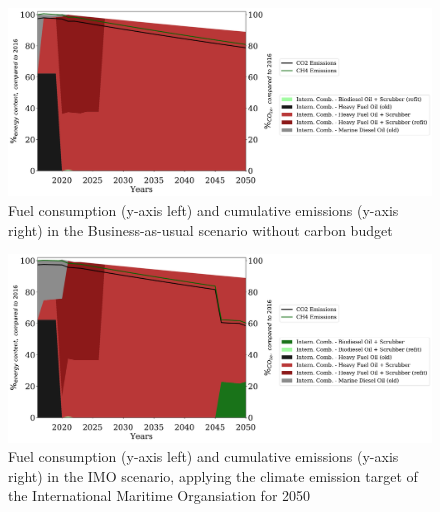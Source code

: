 \documentclass[article]{elsarticle}
\begin{document}
\begin{figure}[htb]
    \centering
    \includegraphics[width=\textwidth]{figures/BAU_fuels_emissions.pdf}
    \caption{Fuel consumption (y-axis left) and cumulative emissions (y-axis right) in the Business-as-usual scenario without carbon budget}
    \label{fig:BAU}
\end{figure}

\begin{figure}[htb]
    \centering
    \includegraphics[width=\textwidth]{figures/IMO_fuels_emissions.pdf}
    \caption{Fuel consumption (y-axis left) and cumulative emissions (y-axis right) in the IMO scenario, applying the climate emission target of the International Maritime Organsiation for 2050}
    \label{fig:IMO}
\end{figure}
\end{document}
